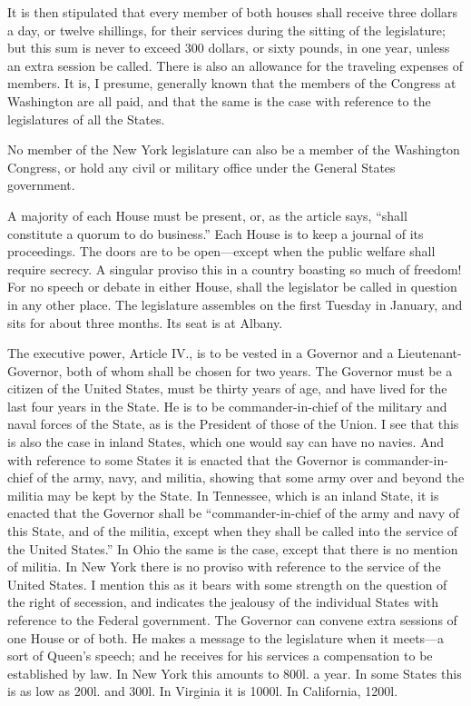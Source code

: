 It is then stipulated that every member of both houses shall
receive three dollars a day, or twelve shillings, for their
services during the sitting of the legislature; but this sum is
never to exceed 300 dollars, or sixty pounds, in one year, unless
an extra session be called.  There is also an allowance for the
traveling expenses of members.  It is, I presume, generally known
that the members of the Congress at Washington are all paid, and
that the same is the case with reference to the legislatures of all
the States.

No member of the New York legislature can also be a member of the
Washington Congress, or hold any civil or military office under the
General States government.

A majority of each House must be present, or, as the article says,
``shall constitute a quorum to do business.''  Each House is to keep
a journal of its proceedings.  The doors are to be open---except
when the public welfare shall require secrecy.  A singular proviso
this in a country boasting so much of freedom!  For no speech or
debate in either House, shall the legislator be called in question
in any other place.  The legislature assembles on the first Tuesday
in January, and sits for about three months.  Its seat is at
Albany.

The executive power, Article IV., is to be vested in a Governor and
a Lieutenant-Governor, both of whom shall be chosen for two years.
The Governor must be a citizen of the United States, must be thirty
years of age, and have lived for the last four years in the State.
He is to be commander-in-chief of the military and naval forces of
the State, as is the President of those of the Union.  I see that
this is also the case in inland States, which one would say can
have no navies.  And with reference to some States it is enacted
that the Governor is commander-in-chief of the army, navy, and
militia, showing that some army over and beyond the militia may be
kept by the State.  In Tennessee, which is an inland State, it is
enacted that the Governor shall be ``commander-in-chief of the army
and navy of this State, and of the militia, except when they shall
be called into the service of the United States.''  In Ohio the same
is the case, except that there is no mention of militia.  In New
York there is no proviso with reference to the service of the
United States.  I mention this as it bears with some strength on
the question of the right of secession, and indicates the jealousy
of the individual States with reference to the Federal government.
The Governor can convene extra sessions of one House or of both.
He makes a message to the legislature when it meets---a sort of
Queen's speech; and he receives for his services a compensation to
be established by law.  In New York this amounts to 800l. a year.
In some States this is as low as 200l. and 300l.  In Virginia it is
1000l.  In California, 1200l.

